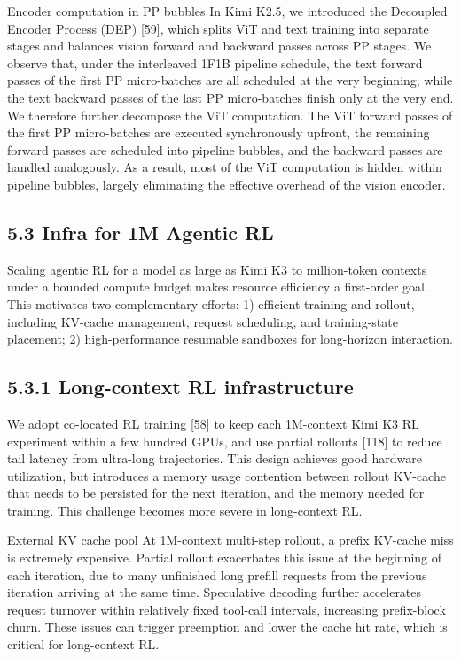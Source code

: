 \documentclass[
  10
]{article}
\begin{document}
Encoder computation in PP bubbles In Kimi K2.5, we introduced the
Decoupled Encoder Process (DEP) {[}59{]}, which splits ViT and text
training into separate stages and balances vision forward and backward
passes across PP stages. We observe that, under the interleaved 1F1B
pipeline schedule, the text forward passes of the first PP micro-batches
are all scheduled at the very beginning, while the text backward passes
of the last PP micro-batches finish only at the very end. We therefore
further decompose the ViT computation. The ViT forward passes of the
first PP micro-batches are executed synchronously upfront, the remaining
forward passes are scheduled into pipeline bubbles, and the backward
passes are handled analogously. As a result, most of the ViT computation
is hidden within pipeline bubbles, largely eliminating the effective
overhead of the vision encoder.

\subsection{5.3 Infra for 1M Agentic RL}\label{infra-for-1m-agentic-rl}

Scaling agentic RL for a model as large as Kimi K3 to million-token
contexts under a bounded compute budget makes resource efficiency a
first-order goal. This motivates two complementary efforts: 1) efficient
training and rollout, including KV-cache management, request scheduling,
and training-state placement; 2) high-performance resumable sandboxes
for long-horizon interaction.

\subsection{5.3.1 Long-context RL
infrastructure}\label{long-context-rl-infrastructure}

We adopt co-located RL training {[}58{]} to keep each 1M-context Kimi K3
RL experiment within a few hundred GPUs, and use partial rollouts
{[}118{]} to reduce tail latency from ultra-long trajectories. This
design achieves good hardware utilization, but introduces a memory usage
contention between rollout KV-cache that needs to be persisted for the
next iteration, and the memory needed for training. This challenge
becomes more severe in long-context RL.

External KV cache pool At 1M-context multi-step rollout, a prefix
KV-cache miss is extremely expensive. Partial rollout exacerbates this
issue at the beginning of each iteration, due to many unfinished long
prefill requests from the previous iteration arriving at the same time.
Speculative decoding further accelerates request turnover within
relatively fixed tool-call intervals, increasing prefix-block churn.
These issues can trigger preemption and lower the cache hit rate, which
is critical for long-context RL.
\end{document}

